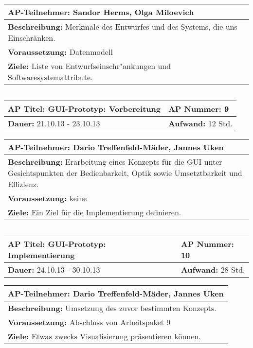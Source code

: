 \begin{tabular}{|p{15.3cm}|}
\hline
\textbf{AP-Teilnehmer: }Sandor Herms, Olga Miloevich\\
\hline
\textbf{Beschreibung: }Merkmale des Entwurfes und des Systems, die uns Einschränken. \\
\hline
\textbf{Voraussetzung: }Datenmodell\\
\hline 
\textbf{Ziele: }Liste von Entwurfseinschr"ankungen und Softwaresystemattribute.\\
\hline 
\end{tabular}
\begin{verbatim}

\end{verbatim}
\begin{tabular}{|p{7.43cm}|p{7.43cm}|}
\hline
\textbf{AP Titel: }GUI-Prototyp: Vorbereitung & \textbf{AP Nummer: }9\\ 
\hline
\textbf{Dauer: }21.10.13 - 23.10.13 & \textbf{Aufwand: }12 Std.\\
\hline
\end{tabular}
\begin{tabular}{|p{15.3cm}|}
\hline
\textbf{AP-Teilnehmer: }Dario Treffenfeld-Mäder, Jannes Uken\\
\hline
\textbf{Beschreibung: }Erarbeitung eines Konzepts für die GUI unter Gesichtspunkten der Bedienbarkeit, Optik sowie Umsetztbarkeit und Effizienz.\\
\hline
\textbf{Voraussetzung: }keine\\
\hline 
\textbf{Ziele: }Ein Ziel für die Implementierung definieren.\\
\hline 
\end{tabular}
\begin{verbatim}

\end{verbatim}
\begin{tabular}{|p{7.43cm}|p{7.43cm}|}
\hline
\textbf{AP Titel: }GUI-Prototyp: Implementierung & \textbf{AP Nummer: }10\\ 
\hline
\textbf{Dauer: }24.10.13 - 30.10.13 & \textbf{Aufwand: }28 Std.\\
\hline
\end{tabular}
\begin{tabular}{|p{15.3cm}|}
\hline
\textbf{AP-Teilnehmer: }Dario Treffenfeld-Mäder, Jannes Uken\\
\hline
\textbf{Beschreibung: }Umsetzung des zuvor bestimmten Konzepts.\\
\hline
\textbf{Voraussetzung: }Abschluss von Arbeitspaket 9\\
\hline 
\textbf{Ziele: }Etwas zwecks Visualisierung präsentieren können.\\
\hline 
\end{tabular}
